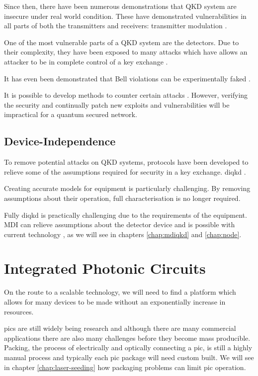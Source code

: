 Since then, there have been numerous demonstrations that \ac{QKD} system are insecure under real world condition. These have demonstrated vulnerabilities in all parts of both the transmitters and receivers: transmitter modulation \cite{Gisin2006}. 

One of the most vulnerable parts of a \ac{QKD} system are the detectors. Due to their complexity, they have been exposed to many attacks which have allows an attacker to be in complete control of a key exchange \cite{Makarov2006, Gerhardt2011a, Lydersen2010a, Lydersen2010b, Lydersen2011, Sauge2011, Makarov2009, Wiechers2011}.

It has even been demonstrated that Bell violations can be experimentally faked \cite{Gerhardt2011b}.

It is possible to develop methods to counter certain attacks \cite{Lydersen2010c, Yuan2010}. However, verifying the security and continually patch new exploits and vulnerabilities will be impractical for a quantum secured network.

\subsection{Device-Independence}

To remove potential attacks on \ac{QKD} systems, protocols have been developed to relieve some of the assumptions required for security in a key exchange. \Ac{diqkd}  \cite{Acin2007, Barrett2005, Mayers1998}. 

Creating accurate models for equipment is particularly challenging. By removing assumptions about their operation, full characterisation is no longer required.

Fully \ac{diqkd} is practically challenging due to the requirements of the equipment. \ac{MDI} can relieve assumptions about the detector device and is possible with current technology \cite{mdi-qkd}, as we will see in chapters \ref{chap:mdiqkd} and \ref{chap:node}. 

\section{Integrated Photonic Circuits}

On the route to a scalable technology, we will need to find a platform which allows for many devices to be made without an exponentially increase in resources. 

\Acp{pic} are still widely being research and although there are many commercial applications there are also many challenges before they become mass producible. Packing, the process of electrically and optically connecting a \ac{pic}, is still a highly manual process and typically each \ac{pic} package will need custom built. We will see in chapter \ref{chap:laser-seeding} how packaging problems can limit \ac{pic} operation.

